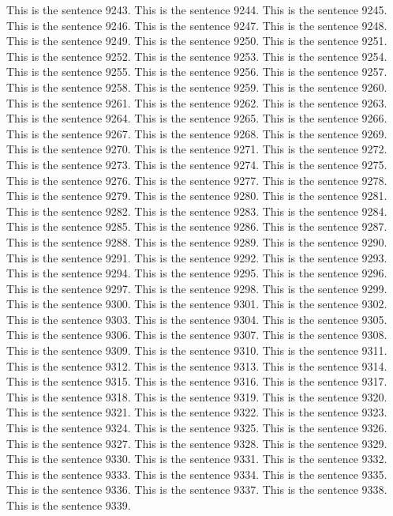 \documentclass{article}
\begin{document}
This is the sentence 9243.
This is the sentence 9244.
This is the sentence 9245.
This is the sentence 9246.
This is the sentence 9247.
This is the sentence 9248.
This is the sentence 9249.
This is the sentence 9250.
This is the sentence 9251.
This is the sentence 9252.
This is the sentence 9253.
This is the sentence 9254.
This is the sentence 9255.
This is the sentence 9256.
This is the sentence 9257.
This is the sentence 9258.
This is the sentence 9259.
This is the sentence 9260.
This is the sentence 9261.
This is the sentence 9262.
This is the sentence 9263.
This is the sentence 9264.
This is the sentence 9265.
This is the sentence 9266.
This is the sentence 9267.
This is the sentence 9268.
This is the sentence 9269.
This is the sentence 9270.
This is the sentence 9271.
This is the sentence 9272.
This is the sentence 9273.
This is the sentence 9274.
This is the sentence 9275.
This is the sentence 9276.
This is the sentence 9277.
This is the sentence 9278.
This is the sentence 9279.
This is the sentence 9280.
This is the sentence 9281.
This is the sentence 9282.
This is the sentence 9283.
This is the sentence 9284.
This is the sentence 9285.
This is the sentence 9286.
This is the sentence 9287.
This is the sentence 9288.
This is the sentence 9289.
This is the sentence 9290.
This is the sentence 9291.
This is the sentence 9292.
This is the sentence 9293.
This is the sentence 9294.
This is the sentence 9295.
This is the sentence 9296.
This is the sentence 9297.
This is the sentence 9298.
This is the sentence 9299.
This is the sentence 9300.
This is the sentence 9301.
This is the sentence 9302.
This is the sentence 9303.
This is the sentence 9304.
This is the sentence 9305.
This is the sentence 9306.
This is the sentence 9307.
This is the sentence 9308.
This is the sentence 9309.
This is the sentence 9310.
This is the sentence 9311.
This is the sentence 9312.
This is the sentence 9313.
This is the sentence 9314.
This is the sentence 9315.
This is the sentence 9316.
This is the sentence 9317.
This is the sentence 9318.
This is the sentence 9319.
This is the sentence 9320.
This is the sentence 9321.
This is the sentence 9322.
This is the sentence 9323.
This is the sentence 9324.
This is the sentence 9325.
This is the sentence 9326.
This is the sentence 9327.
This is the sentence 9328.
This is the sentence 9329.
This is the sentence 9330.
This is the sentence 9331.
This is the sentence 9332.
This is the sentence 9333.
This is the sentence 9334.
This is the sentence 9335.
This is the sentence 9336.
This is the sentence 9337.
This is the sentence 9338.
This is the sentence 9339.
\end{document}
